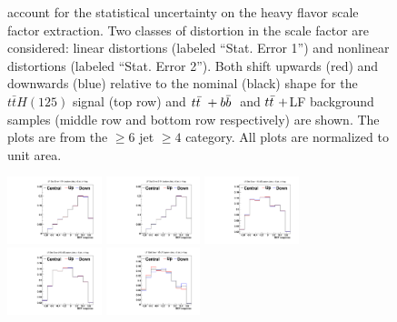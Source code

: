 \begin{description}
\begin{figure}[hbtp]
\begin{center}
{     account for the statistical uncertainty on the heavy flavor scale
     factor extraction.  Two classes of distortion in the scale factor
     are considered: linear distortions (labeled ``Stat. Error 1'')
     and nonlinear distortions (labeled ``Stat. Error 2'').  Both
     shift upwards (red) and downwards (blue) relative to the nominal
     (black) shape for the $t\bar{t}H(125)$ signal (top row) and
     $t{\bar{t}}~+b{\bar{b}}~$ and $t{\bar{t}}~+$LF background samples (middle row
     and bottom row respectively) are shown.  The plots are from the $\geq 6$ jet $\geq 4$
     category.  All plots are normalized to unit area.}
   \label{fig:CSVHFStats}
 \end{center}
\end{figure}

\begin{figure}[hbtp]
 \begin{center}
   \includegraphics[width=0.245\textwidth]{Figures/Analysis_2_Diagrams/SystPlot_CMS_ttH_CSVLFStats1_ttH125_ljets_jge6_tge4}
   \includegraphics[width=0.245\textwidth]{Figures/Analysis_2_Diagrams/SystPlot_CMS_ttH_CSVLFStats2_ttH125_ljets_jge6_tge4}
   \includegraphics[width=0.245\textwidth]{Figures/Analysis_2_Diagrams/SystPlot_CMS_ttH_CSVLFStats1_ttbarPlusBBbar_ljets_jge6_tge4}
   \includegraphics[width=0.245\textwidth]{Figures/Analysis_2_Diagrams/SystPlot_CMS_ttH_CSVLFStats2_ttbarPlusBBbar_ljets_jge6_tge4}
   \includegraphics[width=0.245\textwidth]{Figures/Analysis_2_Diagrams/SystPlot_CMS_ttH_CSVLFStats1_ttbar_ljets_jge6_tge4}

\end{center}
\end{figure}
\end{description}
